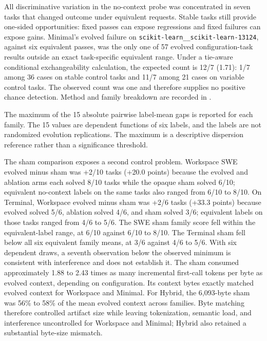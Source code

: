 \documentclass[10pt,twocolumn]{article}
\begin{document}
All discriminative variation in the no-context probe was concentrated in
seven tasks that changed outcome under equivalent requests. Stable tasks
still provide one-sided opportunities: fixed passes can expose
regressions and fixed failures can expose gains. Minimal's evolved
failure on \texttt{scikit-learn\_\_scikit-learn-13124}, against six
equivalent passes, was the only one of 57 evolved configuration-task
results outside an exact task-specific equivalent range. Under a
tie-aware conditional exchangeability calculation, the expected count is
12/7 (1.71): 1/7 among 36 cases on stable control tasks and 11/7 among
21 cases on variable control tasks. The observed count was one and
therefore supplies no positive chance detection. Method and family
breakdown are recorded in
.

The maximum of the 15 absolute pairwise label-mean gaps is reported for
each family. The 15 values are dependent functions of six labels, and
the labels are not randomized evolution replications. The maximum is a
descriptive dispersion reference rather than a significance threshold.

The sham comparison exposes a second control problem. Workspace SWE
evolved minus sham was +2/10 tasks (+20.0 points) because the evolved
and ablation arms each solved 8/10 tasks while the opaque sham solved
6/10; equivalent no-context labels on the same tasks also ranged from
6/10 to 8/10. On Terminal, Workspace evolved minus sham was +2/6 tasks
(+33.3 points) because evolved solved 5/6, ablation solved 4/6, and sham
solved 3/6; equivalent labels on those tasks ranged from 4/6 to 5/6. The
SWE sham family score fell within the equivalent-label range, at 6/10
against 6/10 to 8/10. The Terminal sham fell below all six equivalent
family means, at 3/6 against 4/6 to 5/6. With six dependent draws, a
seventh observation below the observed minimum is consistent with
interference and does not establish it. The sham consumed approximately
1.88 to 2.43 times as many incremental first-call tokens per byte as
evolved context, depending on configuration. Its context bytes exactly
matched evolved context for Workspace and Minimal. For Hybrid, the
6,093-byte sham was 56\% to 58\% of the mean evolved context across
families. Byte matching therefore controlled artifact size while leaving
tokenization, semantic load, and interference uncontrolled for Workspace
and Minimal; Hybrid also retained a substantial byte-size mismatch.
\end{document}
